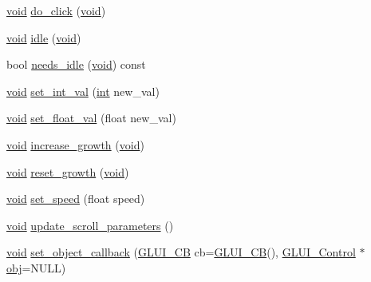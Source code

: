 \begin{DoxyCompactItemize}
\item 
\hyperlink{wglext_8h_a9e6b7f1933461ef318bb000d6bd13b83}{void} \hyperlink{class_g_l_u_i___scrollbar_a83109afdb43d6d8a4cd3e38a4c9aed8a}{do\+\_\+click} (\hyperlink{wglext_8h_a9e6b7f1933461ef318bb000d6bd13b83}{void})
\item 
\hyperlink{wglext_8h_a9e6b7f1933461ef318bb000d6bd13b83}{void} \hyperlink{class_g_l_u_i___scrollbar_ab63e876c8f8e9a781632a09081f286ef}{idle} (\hyperlink{wglext_8h_a9e6b7f1933461ef318bb000d6bd13b83}{void})
\item 
bool \hyperlink{class_g_l_u_i___scrollbar_a025837fc483650dad77140a6a860d608}{needs\+\_\+idle} (\hyperlink{wglext_8h_a9e6b7f1933461ef318bb000d6bd13b83}{void}) const 
\item 
\hyperlink{wglext_8h_a9e6b7f1933461ef318bb000d6bd13b83}{void} \hyperlink{class_g_l_u_i___scrollbar_a2d263e3dde48426abf2ae9952800da24}{set\+\_\+int\+\_\+val} (\hyperlink{wglext_8h_a500a82aecba06f4550f6849b8099ca21}{int} new\+\_\+val)
\item 
\hyperlink{wglext_8h_a9e6b7f1933461ef318bb000d6bd13b83}{void} \hyperlink{class_g_l_u_i___scrollbar_a9218eae03ae93e87d27ac44fdeac212b}{set\+\_\+float\+\_\+val} (float new\+\_\+val)
\item 
\hyperlink{wglext_8h_a9e6b7f1933461ef318bb000d6bd13b83}{void} \hyperlink{class_g_l_u_i___scrollbar_a2bf1121968251b280e917d657fa0dc28}{increase\+\_\+growth} (\hyperlink{wglext_8h_a9e6b7f1933461ef318bb000d6bd13b83}{void})
\item 
\hyperlink{wglext_8h_a9e6b7f1933461ef318bb000d6bd13b83}{void} \hyperlink{class_g_l_u_i___scrollbar_a92d94cb2a3a19b5f8e8e5ab62b44cf89}{reset\+\_\+growth} (\hyperlink{wglext_8h_a9e6b7f1933461ef318bb000d6bd13b83}{void})
\item 
\hyperlink{wglext_8h_a9e6b7f1933461ef318bb000d6bd13b83}{void} \hyperlink{class_g_l_u_i___scrollbar_aa94898fe6a3cd99b8c65c7b68ba079e0}{set\+\_\+speed} (float speed)
\item 
\hyperlink{wglext_8h_a9e6b7f1933461ef318bb000d6bd13b83}{void} \hyperlink{class_g_l_u_i___scrollbar_acb6c92188a213dd09441807bb3cf103c}{update\+\_\+scroll\+\_\+parameters} ()
\item 
\hyperlink{wglext_8h_a9e6b7f1933461ef318bb000d6bd13b83}{void} \hyperlink{class_g_l_u_i___scrollbar_a7d26927f9679f449e6b5628a13851efc}{set\+\_\+object\+\_\+callback} (\hyperlink{class_g_l_u_i___c_b}{G\+L\+U\+I\+\_\+\+C\+B} cb=\hyperlink{class_g_l_u_i___c_b}{G\+L\+U\+I\+\_\+\+C\+B}(), \hyperlink{class_g_l_u_i___control}{G\+L\+U\+I\+\_\+\+Control} $\ast$\hyperlink{glext_8h_a0c0d4701a6c89f4f7f0640715d27ab26}{obj}=N\+U\+L\+L)
\end{DoxyCompactItemize}
